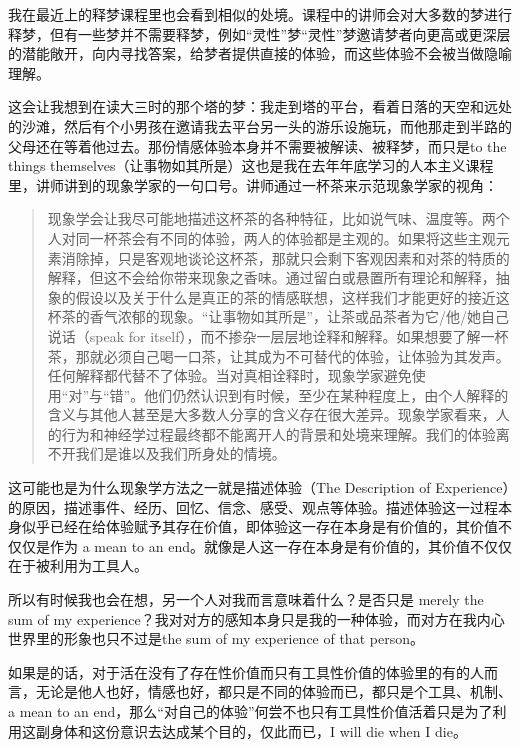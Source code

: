 我在最近上的释梦课程里也会看到相似的处境。课程中的讲师会对大多数的梦进行释梦，但有一些梦并不需要释梦，例如“灵性”梦\pozhehao{}“灵性”梦邀请梦者向更高或更深层的潜能敞开，向内寻找答案，给梦者提供直接的体验，而这些体验不会被当做隐喻理解。

这会让我想到在读大三时的那个塔的梦：我走到塔的平台，看着日落的天空和远处的沙滩，然后有个小男孩在邀请我去平台另一头的游乐设施玩，而他那走到半路的父母还在等着他过去。那份情感体验本身并不需要被解读、被释梦，而只是to the things themselves（让事物如其所是）\pozhehao{}这也是我在去年年底学习的人本主义课程里，讲师讲到的现象学家的一句口号。讲师通过一杯茶来示范现象学家的视角：

\blockquote{现象学会让我尽可能地描述这杯茶的各种特征，比如说气味、温度等。两个人对同一杯茶会有不同的体验，两人的体验都是主观的。如果将这些主观元素消除掉，只是客观地谈论这杯茶，那就只会剩下客观因素和对茶的特质的解释，但这不会给你带来现象之香味。通过留白或悬置所有理论和解释，抽象的假设以及关于什么是真正的茶的情感联想，这样我们才能更好的接近这杯茶的香气浓郁的现象。“让事物如其所是”，让茶或品茶者为它/他/她自己说话（speak for itself），而不掺杂一层层地诠释和解释。如果想要了解一杯茶，那就必须自己喝一口茶，让其成为不可替代的体验，让体验为其发声。任何解释都代替不了体验。当对真相诠释时，现象学家避免使用“对”与“错”。他们仍然认识到有时候，至少在某种程度上，由个人解释的含义与其他人甚至是大多数人分享的含义存在很大差异。现象学家看来，人的行为和神经学过程最终都不能离开人的背景和处境来理解。我们的体验离不开我们是谁以及我们所身处的情境。}

这可能也是为什么现象学方法之一就是描述体验（The Description of Experience）的原因，描述事件、经历、回忆、信念、感受、观点等体验。描述体验这一过程本身似乎已经在给体验赋予其存在价值，即体验这一存在本身是有价值的，其价值不仅仅是作为 a mean to an end。就像是人这一存在本身是有价值的，其价值不仅仅在于被利用为工具人。

所以有时候我也会在想，另一个人对我而言意味着什么？是否只是 merely the sum of my experience？我对对方的感知本身只是我的一种体验，而对方在我内心世界里的形象也只不过是the sum of my experience of that person。

如果是的话，对于活在没有了存在性价值而只有工具性价值的体验里的有的人而言，无论是他人也好，情感也好，都只是不同的体验而已，都只是个工具、机制、a mean to an end，那么“对自己的体验”何尝不也只有工具性价值\pozhehao{}活着只是为了利用这副身体和这份意识去达成某个目的，仅此而已，I will die when I die。

